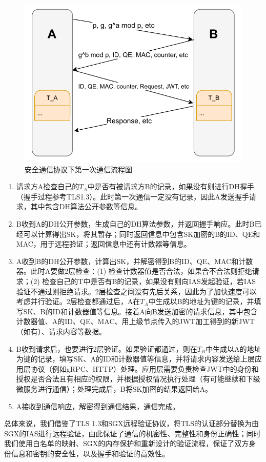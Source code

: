 \begin{figure}[!ht]
    \centering
    \includegraphics[width=.55\textwidth]{figures/communication.pdf}
    \caption{安全通信协议下第一次通信流程图}
    \label{fig:communication}
\end{figure}

\begin{enumerate}
    \item 请求方A检查自己的$T_A$中是否有被请求方B的记录，如果没有则进行DH握手（握手过程参考TLS1.3）。此时第一次通信一定没有记录，因此A发送握手请求，其中包含DH算法公开参数等信息。
    \item B收到A的DH公开参数，生成自己的DH算法参数，并返回握手响应。此时B已经可以计算得出SK，将其暂存；同时返回信息中包含SK加密的B的ID、QE和MAC，用于远程验证；返回信息中还有计数器等信息。
    \item A收到B的DH公开参数，计算出SK，并解密得到B的ID、QE、MAC和计数器。此时A要做2层检查：(1) 检查计数器值是否合法，如果合不合法则拒绝请求；(2) 检查自己的T中是否有B的记录，如果没有则向IAS发起验证，若IAS验证不通过则拒绝请求。2层检查之间没有先后关系，因此为了加快速度可以考虑并行验证。2层检查都通过后，A在$T_A$中生成以B的地址为键的记录，并填写SK、B的ID和计数器值等信息。接着A向B发送加密的请求信息，其中包含计数器值、A的ID、QE、MAC、用上级节点传入的JWT加工得到的新JWT（如有）、请求内容等数据。
    \item B收到请求后，也要进行2层验证。如果验证都通过，则在$T_B$中生成以A的地址为键的记录，填写SK、A的ID和计数器值等信息，并将请求内容发送给上层应用层协议（例如gRPC、HTTP）处理。应用层需要负责检查JWT中的身份和授权是否合法且有相应的权限，并根据授权情况执行处理（有可能继续和下级微服务进行通信）；处理完成后，B将SK加密的结果返回给A。
    \item A接收到通信响应，解密得到通信结果，通信完成。
\end{enumerate}

总体来说，我们借鉴了TLS 1.3和SGX远程验证协议，将TLS的认证部分替换为由SGX的IAS进行远程验证，由此保证了通信的机密性、完整性和身份正确性；同时我们使用白名单的映射、SGX的内存保护和重新设计的验证流程，保证了双方身份信息和密钥的安全性，以及握手和验证的高效性。

